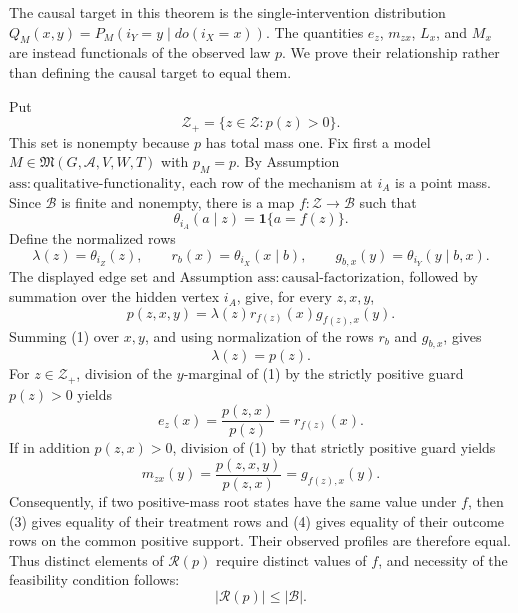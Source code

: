 The causal target in this theorem is the single-intervention distribution
\(Q_M(x,y)=P_M(i_Y=y\mid do(i_X=x))\).  The quantities \(e_z\),
\(m_{zx}\), \(L_x\), and \(M_x\) are instead functionals of the observed
law \(p\).  We prove their relationship rather than defining the causal
target to equal them.

Put
\[
 \mathcal Z_+=\{z\in\mathcal Z:p(z)>0\}.
\]
This set is nonempty because \(p\) has total mass one.  Fix first a model
\(M\in\mathfrak M(G,\mathcal A,V,W,T)\) with \(p_M=p\).  By
Assumption \(\mathrm{ass:qualitative\text{-}functionality}\), each row of
the mechanism at \(i_A\) is a point mass.  Since \(\mathcal B\) is finite
and nonempty, there is a map \(f:\mathcal Z\to\mathcal B\) such that
\[
 \theta_{i_A}(a\mid z)=\mathbf 1\{a=f(z)\}.
\]
Define the normalized rows
\[
 \lambda(z)=\theta_{i_Z}(z),\qquad
 r_b(x)=\theta_{i_X}(x\mid b),\qquad
 g_{b,x}(y)=\theta_{i_Y}(y\mid b,x).
\]
The displayed edge set and Assumption
\(\mathrm{ass:causal\text{-}factorization}\), followed by summation over
the hidden vertex \(i_A\), give, for every \(z,x,y\),
\[
 p(z,x,y)=\lambda(z)r_{f(z)}(x)g_{f(z),x}(y).
\tag{1}
\]
Summing (1) over \(x,y\), and using normalization of the rows \(r_b\) and
\(g_{b,x}\), gives
\[
 \lambda(z)=p(z).
\tag{2}
\]
For \(z\in\mathcal Z_+\), division of the \(y\)-marginal of (1) by the
strictly positive guard \(p(z)>0\) yields
\[
 e_z(x)=\frac{p(z,x)}{p(z)}=r_{f(z)}(x).
\tag{3}
\]
If in addition \(p(z,x)>0\), division of (1) by that strictly positive
guard yields
\[
 m_{zx}(y)=\frac{p(z,x,y)}{p(z,x)}=g_{f(z),x}(y).
\tag{4}
\]
Consequently, if two positive-mass root states have the same value under
\(f\), then (3) gives equality of their treatment rows and (4) gives
equality of their outcome rows on the common positive support.  Their
observed profiles are therefore equal.  Thus distinct elements of
\(\mathcal R(p)\) require distinct values of \(f\), and necessity of the
feasibility condition follows:
\[
 |\mathcal R(p)|\leq|\mathcal B|.
\tag{5}
\]

